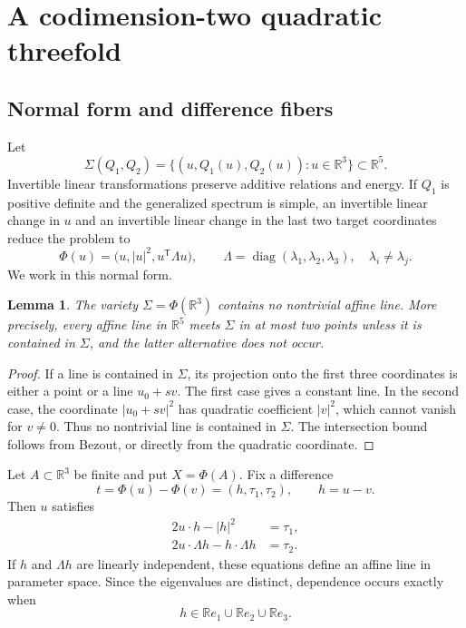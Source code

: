 \documentclass[11pt]{amsart}
\numberwithin{equation}{section}
\newtheorem{lemma}[theorem]{Lemma}
\theoremstyle{definition}
\theoremstyle{remark}
\newcommand{\R}{\mathbb R}
\newcommand{\1}{\mathbf 1}
\begin{document}
\section{A codimension-two quadratic threefold}\label{sec:quadratic-threefold}

\subsection{Normal form and difference fibers}
Let
\[
 \Sigma(Q_1,Q_2)=\{(u,Q_1(u),Q_2(u)):u\in\R^3\}\subset\R^5.
\]
Invertible linear transformations preserve additive relations and energy.  If $Q_1$ is positive definite and the generalized spectrum is simple, an invertible linear change in $u$ and an invertible linear change in the last two target coordinates reduce the problem to
\begin{equation}\label{eq:Phi-normal}
 \Phi(u)=\bigl(u,|u|^2,u^{\mathsf T}\Lambda u\bigr),
 \qquad
 \Lambda=\operatorname{diag}(\lambda_1,\lambda_2,\lambda_3),
 \quad \lambda_i\neq\lambda_j.
\end{equation}
We work in this normal form.

\begin{lemma}\label{lem:no-lines}
The variety $\Sigma=\Phi(\R^3)$ contains no nontrivial affine line.  More precisely, every affine line in $\R^5$ meets $\Sigma$ in at most two points unless it is contained in $\Sigma$, and the latter alternative does not occur.
\end{lemma}

\begin{proof}
If a line is contained in $\Sigma$, its projection onto the first three coordinates is either a point or a line $u_0+sv$.  The first case gives a constant line.  In the second case, the coordinate $|u_0+sv|^2$ has quadratic coefficient $|v|^2$, which cannot vanish for $v\neq0$.  Thus no nontrivial line is contained in $\Sigma$.  The intersection bound follows from Bezout, or directly from the quadratic coordinate.
\end{proof}

Let $A\subset\R^3$ be finite and put $X=\Phi(A)$.  Fix a difference
\[
 t=\Phi(u)-\Phi(v)=(h,\tau_1,\tau_2),
 \qquad h=u-v.
\]
Then $u$ satisfies
\begin{align}
 2u\cdot h-|h|^2&=\tau_1,\label{eq:fiber-one}\\
 2u\cdot\Lambda h-h\cdot\Lambda h&=\tau_2.\label{eq:fiber-two}
\end{align}
If $h$ and $\Lambda h$ are linearly independent, these equations define an affine line in parameter space.  Since the eigenvalues are distinct, dependence occurs exactly when
\begin{equation}\label{eq:rankdrop-directions}
 h\in\R e_1\cup\R e_2\cup\R e_3.
\end{equation}
\end{document}
